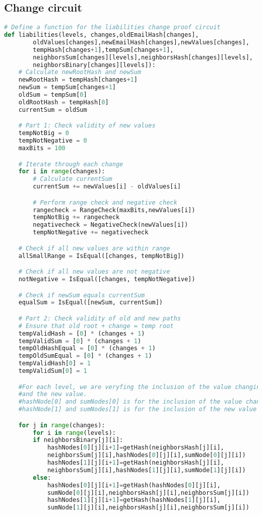\subsection{Change circuit}
\label{subsec:plcc}
\begin{lstlisting}[language=Python, caption=Liabilities change circuit pseudocode]
# Define a function for the liabilities change proof circuit
def liabilities(levels, changes,oldEmailHash[changes],
        oldValues[changes],newEmailHash[changes],newValues[changes],
        tempHash[changes+1],tempSum[changes+1],
        neighborsSum[changes][levels],neighborsHash[changes][levels],
        neighborsBinary[changes][levels]):         
    # Calculate newRootHash and newSum
    newRootHash = tempHash[changes+1]
    newSum = tempSum[changes+1]
    oldSum = tempSum[0]
    oldRootHash = tempHash[0]
    currentSum = oldSum

    # Part 1: Check validity of new values
    tempNotBig = 0
    tempNotNegative = 0
    maxBits = 100

    # Iterate through each change
    for i in range(changes):
        # Calculate currentSum
        currentSum += newValues[i] - oldValues[i]

        # Perform range check and negative check
        rangecheck = RangeCheck(maxBits,newValues[i])
        tempNotBig += rangecheck
        negativecheck = NegativeCheck(newValues[i])
        tempNotNegative += negativecheck

    # Check if all new values are within range
    allSmallRange = IsEqual([changes, tempNotBig])

    # Check if all new values are not negative
    notNegative = IsEqual([changes, tempNotNegative])

    # Check if newSum equals currentSum
    equalSum = IsEqual([newSum, currentSum])

    # Part 2: Check validity of old and new paths
    # Ensure that old root + change = temp root
    tempValidHash = [0] * (changes + 1)
    tempValidSum = [0] * (changes + 1)
    tempOldHashEqual = [0] * (changes + 1)
    tempOldSumEqual = [0] * (changes + 1)
    tempValidHash[0] = 1
    tempValidSum[0] = 1

    #For each level, we are veryfing the inclusion of the value changing
    #and the new value.
    #hashNode[0] and sumNodes[0] is for the inclusion of the value changing
    #hashNode[1] and sumNodes[1] is for the inclusion of the new value

    for j in range(changes):
        for i in range(levels):
        if neighborsBinary[j][i]:
            hashNodes[0][j][i+1]=getHash(neighborsHash[j][i],
            neighborsSum[j][i],hashNodes[0][j][i],sumNode[0][j][i])
            hashNodes[1][j][i+1]=getHash(neighborsHash[j][i],
            neighborsSum[j][i],hashNodes[1][j][i],sumNode[1][j][i])
        else:
            hashNodes[0][j][i+1]=getHash(hashNodes[0][j][i],
            sumNode[0][j][i],neighborsHash[j][i],neighborsSum[j][i])
            hashNodes[1][j][i+1]=getHash(hashNodes[1][j][i],
            sumNode[1][j][i],neighborsHash[j][i],neighborsSum[j][i])


\end{lstlisting}

